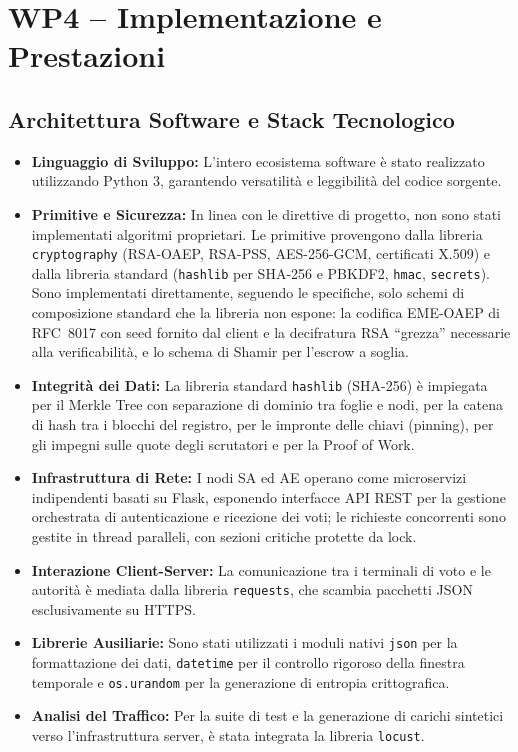\documentclass[12pt,a4paper]{article}
\begin{document}
\newpage

\section{WP4 – Implementazione e Prestazioni}

\subsection{Architettura Software e Stack Tecnologico}

\begin{itemize}
  \item \textbf{Linguaggio di Sviluppo:} L'intero ecosistema software è stato realizzato utilizzando Python 3, garantendo versatilità e leggibilità del codice sorgente.
  \item \textbf{Primitive e Sicurezza:} In linea con le direttive di progetto, non sono stati implementati algoritmi proprietari. Le primitive provengono dalla libreria \texttt{cryptography} (RSA-OAEP, RSA-PSS, AES-256-GCM, certificati X.509) e dalla libreria standard (\texttt{hashlib} per SHA-256 e PBKDF2, \texttt{hmac}, \texttt{secrets}). Sono implementati direttamente, seguendo le specifiche, solo schemi di composizione standard che la libreria non espone: la codifica EME-OAEP di RFC~8017 con seed fornito dal client e la decifratura RSA ``grezza'' necessarie alla verificabilità, e lo schema di Shamir per l'escrow a soglia.
  \item \textbf{Integrità dei Dati:} La libreria standard \texttt{hashlib} (SHA-256) è impiegata per il Merkle Tree con separazione di dominio tra foglie e nodi, per la catena di hash tra i blocchi del registro, per le impronte delle chiavi (pinning), per gli impegni sulle quote degli scrutatori e per la Proof of Work.
  \item \textbf{Infrastruttura di Rete:} I nodi SA ed AE operano come microservizi indipendenti basati su Flask, esponendo interfacce API REST per la gestione orchestrata di autenticazione e ricezione dei voti; le richieste concorrenti sono gestite in thread paralleli, con sezioni critiche protette da lock.
  \item \textbf{Interazione Client-Server:} La comunicazione tra i terminali di voto e le autorità è mediata dalla libreria \texttt{requests}, che scambia pacchetti JSON esclusivamente su HTTPS.
  \item \textbf{Librerie Ausiliarie:} Sono stati utilizzati i moduli nativi \texttt{json} per la formattazione dei dati, \texttt{datetime} per il controllo rigoroso della finestra temporale e \texttt{os.urandom} per la generazione di entropia crittografica.
  \item \textbf{Analisi del Traffico:} Per la suite di test e la generazione di carichi sintetici verso l'infrastruttura server, è stata integrata la libreria \texttt{locust}.
\end{itemize}
\end{document}
